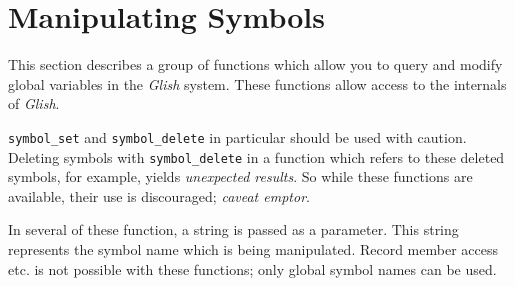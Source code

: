 
\section{Manipulating Symbols}
\label{predefineds-symbols}

This section describes a group of functions which allow you to query
and modify global variables in the {\em Glish} system. These functions
allow access to the internals of {\em Glish}.

{\tt symbol\_set}  and {\tt symbol\_delete} in particular
should be used with caution. Deleting symbols with {\tt symbol\_delete}
in a function which refers to these deleted symbols, for example, yields
{\em unexpected results}. So while these functions are available, their
use is discouraged; {\em caveat emptor}.

In several of these function, a string is passed as a parameter. This string
represents the symbol name which is being manipulated. Record member access
etc. is not possible with these functions; only global symbol names can be used.

